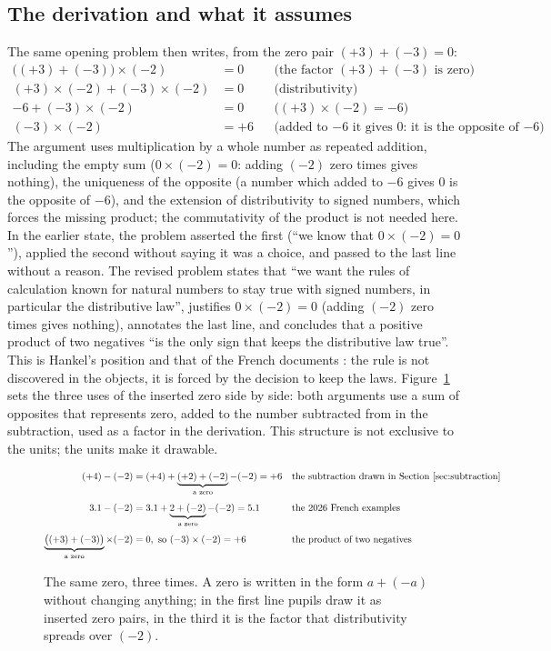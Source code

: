 \documentclass[11pt,a4paper]{article}
\theoremstyle{definition}
\begin{document}
\subsection{The derivation and what it assumes}
The same opening problem then writes, from the zero pair $(+3)+(-3)=0$:
\[
\begin{aligned}
\bigl((+3)+(-3)\bigr)\times(-2)&=0 &&\text{(the factor $(+3)+(-3)$ is zero)}\\
(+3)\times(-2)+(-3)\times(-2)&=0 &&\text{(distributivity)}\\
-6+(-3)\times(-2)&=0 &&\text{($(+3)\times(-2)=-6$)}\\
(-3)\times(-2)&=+6 &&\text{(added to $-6$ it gives $0$: it is the opposite of $-6$)}
\end{aligned}
\]
The argument uses multiplication by a whole number as repeated addition, including the empty sum ($0\times(-2)=0$: adding $(-2)$ zero times gives nothing), the uniqueness of the opposite (a number which added to $-6$ gives $0$ is the opposite of $-6$), and the extension of distributivity to signed numbers, which forces the missing product; the commutativity of the product is not needed here. In the earlier state, the problem asserted the first (``we know that $0\times(-2)=0$''), applied the second without saying it was a choice, and passed to the last line without a reason. The revised problem states that ``we want the rules of calculation known for natural numbers to stay true with signed numbers, in particular the distributive law'', justifies $0\times(-2)=0$ (adding $(-2)$ zero times gives nothing), annotates the last line, and concludes that a positive product of two negatives ``is the only sign that keeps the distributive law true''. This is Hankel's position \citep{Hankel1867} and that of the French documents \citep{Eduscol2016Relatifs,MEN2026Exemples}: the rule is not discovered in the objects, it is forced by the decision to keep the laws. Figure~\ref{fig:zero} sets the three uses of the inserted zero side by side: both arguments use a sum of opposites that represents zero, added to the number subtracted from in the subtraction, used as a factor in the derivation. This structure is not exclusive to the units; the units make it drawable.

\begin{figure}[htbp]
\centering
\[
\begin{aligned}
(+4)-(-2)&=(+4)+\underbrace{(+2)+(-2)}_{\text{a zero}}-(-2)=+6 &&\text{the subtraction drawn in Section~\ref{sec:subtraction}}\\[4pt]
3.1-(-2)&=3.1+\underbrace{2+(-2)}_{\text{a zero}}-(-2)=5.1 &&\text{the 2026 French examples}\\[4pt]
\underbrace{\bigl((+3)+(-3)\bigr)}_{\text{a zero}}\times(-2)&=0, \text{ so } (-3)\times(-2)=+6 &&\text{the product of two negatives}
\end{aligned}
\]
\caption{The same zero, three times. A zero is written in the form $a+(-a)$ without changing anything; in the first line pupils draw it as inserted zero pairs, in the third it is the factor that distributivity spreads over $(-2)$.}
\label{fig:zero}
\end{figure}
\end{document}
